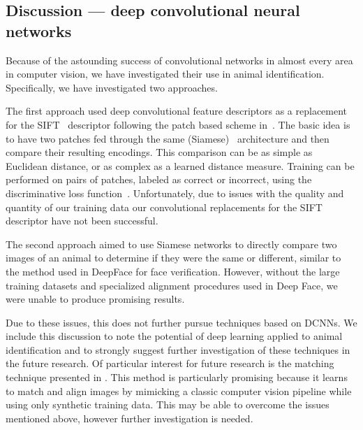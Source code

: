   \subsection{Discussion --- deep convolutional neural networks}\label{subsec:dcnndiscuss}
        Because of the astounding success of convolutional networks in almost every area in computer vision, we have
        investigated their use in animal identification. Specifically, we have investigated two approaches.

        The first approach used deep convolutional feature descriptors as a replacement for the
        SIFT~\cite{lowe_distinctive_2004} descriptor following the patch based scheme in~\cite{zagoruyko_learning_2015}.
        The basic idea is to have two patches fed through the same (Siamese)~\cite{chopra_learning_2005} architecture
        and then compare their resulting encodings. This comparison can be as simple as Euclidean distance, or as
        complex as a learned distance measure. Training can be performed on pairs of patches, labeled as correct or
        incorrect, using the discriminative loss function~\cite{lecun_loss_2005}. Unfortunately, due to issues with the
        quality and quantity of our training data our convolutional replacements for the SIFT descriptor have not been
        successful.

        The second approach aimed to use Siamese networks to directly compare two images of an animal to determine if
        they were the same or different, similar to the method used in DeepFace\cite{taigman_deepface_2014} for face
        verification. However, without the large training datasets and specialized alignment procedures used in Deep
        Face, we were unable to produce promising results.
        
        Due to these issues, this \thesis{} does not further pursue techniques based on DCNNs. We include this
        discussion to note the potential of deep learning applied to animal identification and to strongly suggest
        further investigation of these techniques in the future research. Of particular interest for future
        research is the matching technique presented in \cite{rocco_convolutional_2017}. This method is
        particularly promising because it learns to match and align images by mimicking a classic computer vision
        pipeline while using only synthetic training data. This may be able to overcome the issues mentioned above,
        however further investigation is needed.

